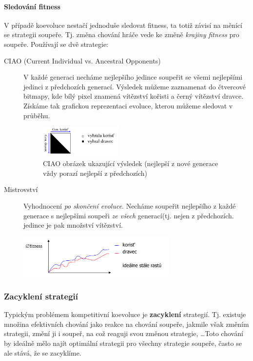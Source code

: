 \paragraph{Sledování fitness}
V případě koevoluce nestačí jednoduše sledovat fitness, ta totiž závisí na měnící se strategii soupeře. Tj. změna chování hráče vede ke změně \textit{krajiny fitness} pro soupeře. Používají se dvě strategie:
\begin{description}
\item[CIAO (Current Individual vs. Ancestral Opponents)] V každé generaci necháme nejlepšího jedince soupeřit se všemi nejlepšími jedinci z předchozích generací. Výsledek můžeme zaznamenat do čtvercové bitmapy, kde bílý pixel znamená vítězství kořisti a černý vítězství dravce. Získáme tak grafickou reprezentaci evoluce, kterou můžeme sledovat v průběhu.

\begin{figure}[H]
\centering
\includegraphics[width=0.4\textwidth]{img/ciao.png}
\caption{CIAO obrázek ukazující  výsledek (nejlepší z nové generace vždy porazí nejlepší z předchozích)}
\end{figure}

\item[Mistrovství] Vyhodnocení \textit{po skončení evoluce}. Necháme soupeřit nejlepšího z každé generace s nejlepšími soupeři \textit{ze všech} generací(tj. nejen z předchozích.  jedince je pak množství vítězství.
\end{description}

\begin{figure}[H]
\centering
\includegraphics[width=0.7\textwidth]{img/mistrovstvi.png}
\end{figure}


\subsubsection{Zacyklení strategií}
Typickým problémem kompetitivní koevoluce je \textbf{zacyklení} strategií. Tj. existuje množina efektivních chování jako reakce na chování soupeře, jakmile však změním strategii, změní ji i soupeř, na což reaguji svou změnou strategie, \dots Toto chování by ideálně mělo najít optimální strategii pro všechny strategie soupeře, často se ale stává, že se zacyklíme. 

